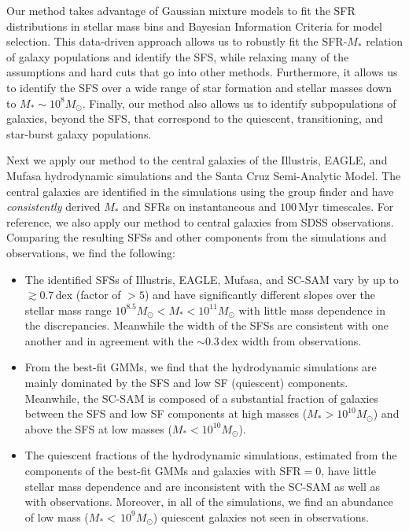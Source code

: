 \documentclass[tighten, preprint]{aastex62}
\begin{document}
Our method takes advantage of Gaussian mixture models to fit the SFR
distributions in stellar mass bins and Bayesian Information Criteria 
for model selection. This data-driven approach allows us to robustly 
fit the SFR-$M_*$ relation of galaxy populations and identify the SFS, 
while relaxing many of the assumptions and hard cuts that go into 
other methods. Furthermore, it allows us to identify the SFS over a wide 
range of star formation and stellar masses down to 
$M_*{\sim}10^{8}M_\odot$. Finally, our method also allows us to identify 
subpopulations of galaxies, beyond the SFS, that correspond to the 
quiescent, transitioning, and star-burst galaxy populations. 

Next we apply our method to the central galaxies of the Illustris, EAGLE, 
and {\sc Mufasa} hydrodynamic simulations and the Santa 
Cruz Semi-Analytic Model. The central galaxies are identified in the  
simulations using the \cite{tinker2011} group 
finder and have \emph{consistently} derived $M_*$ and SFRs on instantaneous 
and $100\,\mathrm{Myr}$ timescales. For reference, we also apply our 
method to central galaxies from SDSS observations. Comparing the resulting 
SFSs and other components from the simulations and observations, we find the following:

\begin{itemize}
\item {\color{red} The identified SFSs of Illustris, EAGLE, {\sc Mufasa}, and SC-SAM 
vary by up to ${\gtrsim}0.7\,\mathrm{dex}$ (factor of ${>}5$) and have 
significantly different slopes over the stellar mass}
range $10^{8.5} M_\odot < M_* < 10^{11} M_\odot$ with little mass
dependence in the discrepancies. Meanwhile the width of the SFSs 
are consistent with one another and in agreement with the 
$\sim 0.3\,\mathrm{dex}$ width from observations.

\item From the best-fit GMMs, we find that the hydrodynamic simulations are 
mainly dominated by the SFS and low SF (quiescent) components. Meanwhile,
the SC-SAM is composed of a substantial fraction of galaxies between the 
SFS and low SF components at high masses ($M_* > 10^{10}M_\odot$) and above 
the SFS at low masses ($M_* < 10^{10}M_\odot$).

\item The quiescent fractions of the hydrodynamic simulations, estimated 
from the components of the best-fit GMMs and galaxies with $\mathrm{SFR}{=}0$, 
have little stellar mass dependence and are inconsistent with 
the SC-SAM as well as with observations. Moreover, in all of the simulations, we find 
an abundance of low mass ($M_*{<}\,10^9M_\odot$) quiescent galaxies not 
seen in observations. %
\end{itemize}
\end{document}
